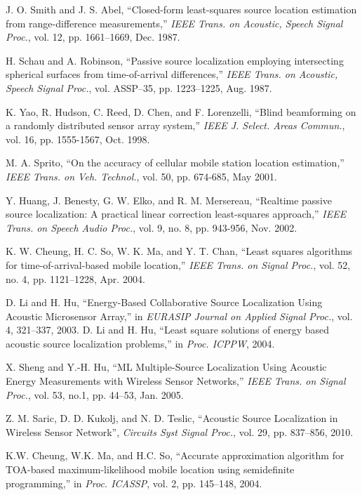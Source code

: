 \begin{thebibliography}{99}


J. O. Smith and J. S. Abel, ``Closed-form least-squares source location
estimation from range-difference measurements,'' {\em IEEE Trans. on Acoustic, Speech Signal Proc.}, vol. 12, pp. 1661--1669, Dec. 1987.

H. Schau and A. Robinson, ``Passive source localization employing intersecting spherical surfaces from time-of-arrival differences,'' {\em IEEE Trans. on Acoustic, Speech Signal Proc.}, vol. ASSP--35, pp. 1223--1225, Aug. 1987.

K. Yao, R. Hudson, C. Reed, D. Chen, and F. Lorenzelli, ``Blind beamforming on a randomly
distributed sensor array system,'' {\em IEEE J. Select. Areas Commun.}, vol. 16, pp. 1555-1567, Oct. 1998.

 M. A. Sprito, ``On the accuracy of cellular mobile station location estimation,'' {\em IEEE Trans. on Veh. Technol.}, vol. 50, pp. 674-685, May 2001.

 Y. Huang, J. Benesty, G. W. Elko, and R. M. Mersereau, ``Realtime passive source localization: A practical linear correction least-squares approach,'' {\em IEEE Trans. on Speech Audio Proc.}, vol. 9, no. 8, pp. 943-956, Nov. 2002.


 K. W. Cheung, H. C. So, W. K. Ma, and Y. T. Chan, ``Least squares algorithms for time-of-arrival-based mobile location,'' {\em IEEE Trans. on Signal Proc.}, vol. 52, no. 4, pp. 1121--1228, Apr. 2004.

D. Li and H. Hu, ``Energy-Based Collaborative Source Localization Using Acoustic Microsensor Array,'' in {\em EURASIP Journal on Applied Signal Proc.}, vol. 4, 321--337, 2003.
D. Li and H. Hu, ``Least square solutions of energy based acoustic source localization problems,'' in {\em Proc. ICPPW}, 2004.

X. Sheng and Y.-H. Hu, ``ML Multiple-Source Localization Using Acoustic Energy Measurements with Wireless Sensor Networks,'' {\em IEEE Trans. on Signal Proc.}, vol. 53, no.1, pp. 44--53, Jan. 2005.

Z. M. Saric, D. D. Kukolj, and N. D. Teslic, ``Acoustic Source Localization in Wireless Sensor Network'', {\em Circuits Syst Signal Proc.}, vol. 29, pp. 837--856, 2010.

K.W. Cheung, W.K. Ma, and H.C. So, ``Accurate approximation algorithm for TOA-based maximum-likelihood mobile location using semidefinite programming,'' in {\em Proc. ICASSP}, vol. 2, pp. 145--148, 2004.


\end{thebibliography}
